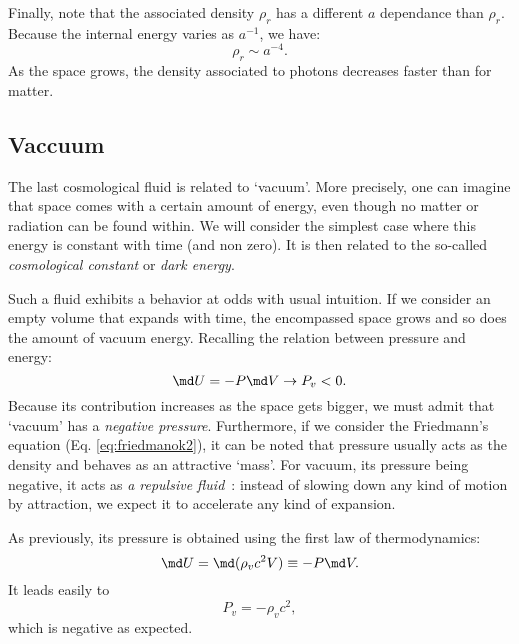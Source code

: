 Finally, note that the associated density $\rho_r$ has a different $a$ dependance than $\rho_r$. Because the internal energy varies as $a^{-1}$, we have:
\begin{equation}
	\rho_r \sim a^{-4}.
\end{equation}
As the space grows, the density associated to photons decreases faster than for matter.
\subsection{Vaccuum} %
\label{sub:vaccuum}
The last cosmological fluid is related to `vacuum'. More precisely, one can imagine that space comes with a certain amount of energy, even though no matter or radiation can be found within. We will consider the simplest case where this energy is constant with time (and non zero). It is then related to the so-called \emph{cosmological constant} or \emph{dark energy}.

Such a fluid exhibits a behavior at odds with usual intuition. If we consider an empty volume that expands with time, the encompassed space grows and so does the amount of vacuum energy. Recalling the relation between pressure and energy:
\begin{equation}
	\md U= -P \md V \rightarrow P_v < 0.
\end{equation}
Because its contribution increases as the space gets bigger, we must admit that `vacuum' has a \emph{negative pressure}. Furthermore, if we consider the Friedmann's equation (Eq. \ref{eq:friedmanok2}), it can be noted that pressure usually acts as the density and behaves as an attractive `mass'. For vacuum, its pressure being negative, it acts as \emph{a repulsive fluid}~: instead of slowing down any kind of motion by attraction, we expect it to accelerate any kind of expansion. 

As previously, its pressure is obtained using the first law of thermodynamics:
\begin{equation}
	\md U=\md (\rho_v c^2 V)\equiv -P\md V.
\end{equation}
It leads easily to 
\begin{equation}
	P_v=-\rho_v c^2,
\end{equation}
which is negative as expected.
